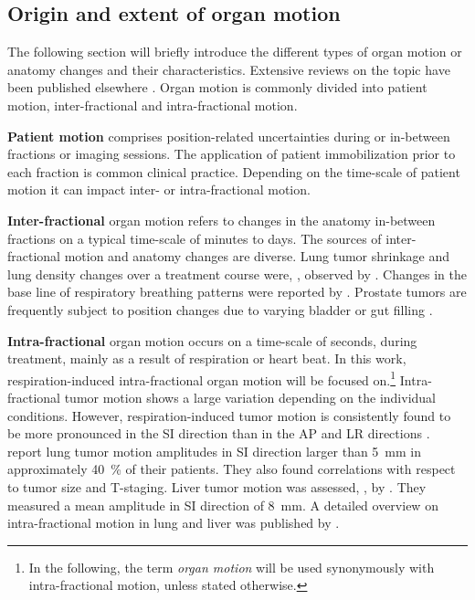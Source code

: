 \subsection{Origin and extent of organ motion}
The following section will briefly introduce the different types of
organ motion or anatomy changes and their characteristics. Extensive
reviews on the topic have been published elsewhere
\citep{Langen2001}. Organ motion is commonly divided into patient
motion, inter-fractional and intra-fractional motion.

\textbf{Patient motion} comprises position-related uncertainties
during or in-between fractions or imaging sessions. The application of
patient immobilization prior to each fraction is common clinical
practice. Depending on the time-scale of patient motion it can impact inter-
or intra-fractional motion.

\textbf{Inter-fractional} organ motion refers to changes in the
anatomy in-between fractions on a typical time-scale of minutes to
days. The sources of inter-fractional motion and anatomy changes are
diverse. Lung tumor shrinkage and lung density changes over a
treatment course were, \eg, observed by \citet{Mori2009}. Changes in
the base line of respiratory breathing patterns were \ia reported by
\citet{Sonke2008}. Prostate tumors are frequently subject to position
changes due to varying bladder or gut filling \citep{Fokdal2004}.

\textbf{Intra-fractional} organ motion occurs on a time-scale of
seconds, \ie during treatment, mainly as a result of respiration
or heart beat. In this work, respiration-induced intra-fractional
organ motion will be focused on.\footnote{In the following, the term
  \emph{organ motion} will be used synonymously with intra-fractional
  motion, unless stated otherwise.} Intra-fractional tumor motion
shows a large variation depending on the individual
conditions. However, respiration-induced tumor motion is consistently
found to be more pronounced in the \ac{SI} direction than in the
\ac{AP} and \ac{LR} directions
\citep{Seppenwoolde2002,Britton2007,Liu2007,Case2010}. \citet{Liu2007}
report lung tumor motion amplitudes in \ac{SI} direction larger than
\SI{5}{\milli\meter} in approximately \SI{40}{\%} of their
patients. They also found correlations with respect to tumor size and
T-staging. Liver tumor motion was assessed, \eg, by
\citet{Case2010}. They measured a mean amplitude in \ac{SI} direction
of \SI{8}{\milli\meter}.  A detailed overview on intra-fractional
motion in lung and liver was published by \citet{Shirato2004}.

